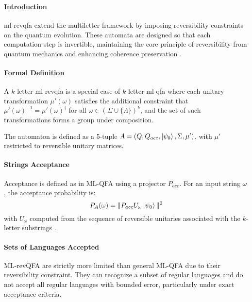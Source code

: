 \subsubsection{}
\paragraph{Introduction}
\gls{ml-revqfa} extend the multiletter framework by imposing reversibility constraints on the quantum evolution. These automata are designed so that each computation step is invertible, maintaining the core principle of reversibility from quantum mechanics and enhancing coherence preservation \cite{belovs2007multi}.

\paragraph{Formal Definition}
A $k$-letter \gls{ml-revqfa} is a special case of $k$-letter \gls{ml-qfa} where each unitary transformation $\mu'(\omega)$ satisfies the additional constraint that $\mu'(\omega)^{-1} = \mu'(\omega)^\dagger$ for all $\omega \in (\Sigma \cup \{\Lambda\})^k$, and the set of such transformations forms a group under composition.

The automaton is defined as a 5-tuple $A = (Q, Q_{acc}, \ket{\psi_0}, \Sigma, \mu')$, with $\mu'$ restricted to reversible unitary matrices.

\paragraph{Strings Acceptance}
Acceptance is defined as in ML-QFA using a projector $P_{acc}$. For an input string $\omega$, the acceptance probability is:
\[
P_A(\omega) = \| P_{acc} U_{\omega} \ket{\psi_0} \|^2
\]
with $U_{\omega}$ computed from the sequence of reversible unitaries associated with the $k$-letter substrings \cite{belovs2007multi}.

\paragraph{Sets of Languages Accepted}
ML-revQFA are strictly more limited than general ML-QFA due to their reversibility constraint. They can recognize a subset of regular languages and do not accept all regular languages with bounded error, particularly under exact acceptance criteria.


